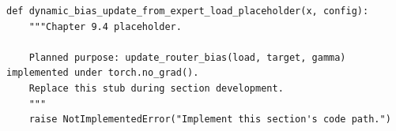 \begin{lstlisting}[style=bookpython,caption={Planned code placeholder for dynamic bias update from expert load.},label={lst:ch09-dynamic-bias-update-from-expert-load}]
def dynamic_bias_update_from_expert_load_placeholder(x, config):
    """Chapter 9.4 placeholder.

    Planned purpose: update_router_bias(load, target, gamma) implemented under torch.no_grad().
    Replace this stub during section development.
    """
    raise NotImplementedError("Implement this section's code path.")
\end{lstlisting}
